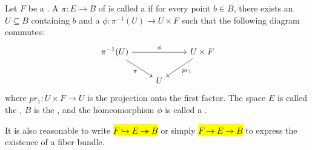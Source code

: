 \begin{definition} \label{definition:fiber_bundle_of_topological_spaces}
Let $F$ be a . 
A  $\pi: E \to B$ of  is called a  if for every point $b \in B$, there exists an  $U \subseteq B$ containing $b$ and a  $\phi: \pi^{-1}(U) \to U \times F$ such that the following diagram commutes:
$$
\begin{tikzcd}
\pi^{-1}(U) \arrow[rr, "\phi"] \arrow[dr, "\pi"'] & & U \times F \arrow[dl, "pr_1"] \\
& U & 
\end{tikzcd}
$$
where $pr_1: U \times F \to U$ is the projection onto the first factor. 
The space $E$ is called the , $B$ is the , and the homeomorphism $\phi$ is called a .

It is also reasonable to write \hl{$F \hookrightarrow E \twoheadrightarrow B$} or simply \hl{$F \to E \to B$} to express the existence of a fiber bundle.
\end{definition}
